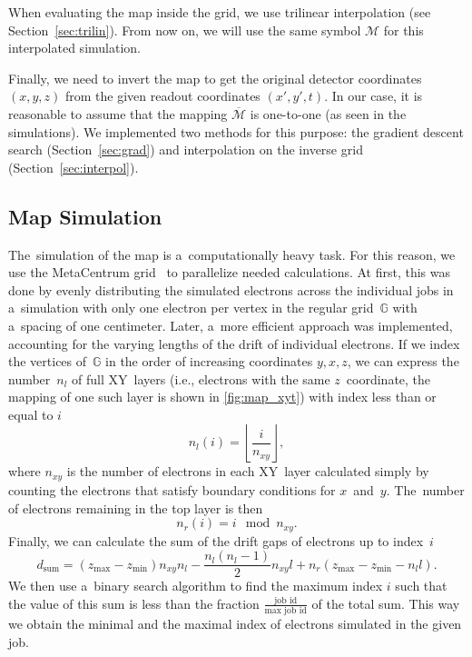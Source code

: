 		When evaluating the map inside the grid, we use trilinear interpolation (see Section~\ref{sec:trilin}). From now on, we will use the same symbol $\mathcal{M}$ for this interpolated simulation.
		
		Finally, we need to invert the map to get the original detector coordinates $(x,y,z)$ from the given readout coordinates $(x',y',t)$. In our case, it is reasonable to assume that the mapping $\overline{\mathcal{M}}$ is one-to-one (as seen in the simulations). We implemented two methods for this purpose: the gradient descent search (Section~\ref{sec:grad}) and interpolation on the inverse grid (Section~\ref{sec:interpol}).
		
		\subsection{Map Simulation}
			The~simulation of the map is a~computationally heavy task. For this reason, we use the MetaCentrum grid~\cite{metacentrum} to parallelize needed calculations. At first, this was done by evenly distributing the simulated electrons across the individual jobs in a~simulation with only one electron per vertex in the regular grid~$\mathbb{G}$ with a~spacing of one centimeter. Later, a~more efficient approach was implemented, accounting for the varying lengths of the drift of individual electrons. If we index the vertices of~$\mathbb{G}$ in the order of increasing coordinates $y,x,z$, we can express the number~$n_l$ of full XY~layers (i.e., electrons with the same $z$~coordinate, the mapping of one such layer is shown in \cref{fig:map_xyt}) with index less than or equal to $i$
				\begin{equation}
					n_l(i) = \left\lfloor\frac{i}{n_{xy}}\right\rfloor,
				\end{equation}
			where $n_{xy}$ is the number of electrons in each XY~layer calculated simply by counting the electrons that satisfy boundary conditions for $x$~and~$y$. The~number of electrons remaining in the top layer is then
				\begin{equation}
					n_r(i) = i\!\!\!\!\mod n_{xy}.
				\end{equation}
			Finally, we can calculate the sum of the drift gaps of electrons up to index~$i$
				\begin{equation}
					d_\text{sum} = (z_\text{max}-z_\text{min})n_{xy}n_l-\frac{n_l(n_l-1)}{2}n_{xy}l+n_r(z_\text{max}-z_\text{min}-n_l l).
				\end{equation}
			We then use a~binary search algorithm to find the maximum index $i$ such that the value of this sum is less than the fraction $\frac{\text{job id}}{\text{max job id}}$ of the total sum. This way we obtain the minimal and the maximal index of electrons simulated in the given job.
			
